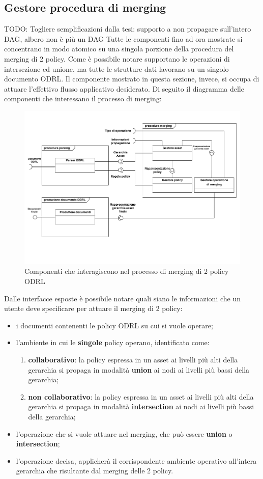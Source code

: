\documentclass[12pt,a4paper,twoside]{book}
\begin{document}
\subsection{Gestore procedura di merging}
TODO: Togliere semplificazioni dalla tesi: supporto a non propagare sull'intero DAG, albero non è più un DAG
Tutte le componenti fino ad ora mostrate si concentrano in modo atomico su una singola porzione della procedura del merging di 2 policy. Come è possibile notare supportano le operazioni di intersezione ed unione, ma tutte le strutture dati lavorano su un singolo documento ODRL. Il componente mostrato in questa sezione, invece, si occupa di attuare l'effettivo flusso applicativo desiderato. Di seguito il diagramma delle componenti che interessano il processo di merging:
\begin{figure}[H]
	\centering
	\includegraphics[scale=.70]{../immagini/processoMergin.pdf}
	\caption{Componenti che interagiscono nel processo di merging di 2 policy ODRL}
	\label{procMergin}
\end{figure}
Dalle interfacce esposte è possibile notare quali siano le informazioni che un utente deve specificare per attuare il merging di 2 policy:
\begin{itemize}
	\item i documenti contenenti le policy ODRL su cui si vuole operare;
	\item l'ambiente in cui le \textbf{singole} policy operano, identificato come:
	\begin{enumerate}
		\item \textbf{collaborativo}: la policy espressa in un asset ai livelli più alti della gerarchia si propaga in modalità \textbf{union} ai nodi ai livelli più bassi della gerarchia;
		\item \textbf{non collaborativo}: la policy espressa in un asset ai livelli più alti della gerarchia si propaga in modalità \textbf{intersection} ai nodi ai livelli più bassi della gerarchia;
	\end{enumerate} 
	\item l'operazione che si vuole attuare nel merging, che può essere \textbf{union} o \textbf{intersection};
	\item l'operazione decisa, applicherà il corrispondente ambiente operativo all'intera gerarchia che risultante dal merging delle 2 policy.
\end{itemize}
\end{document}
